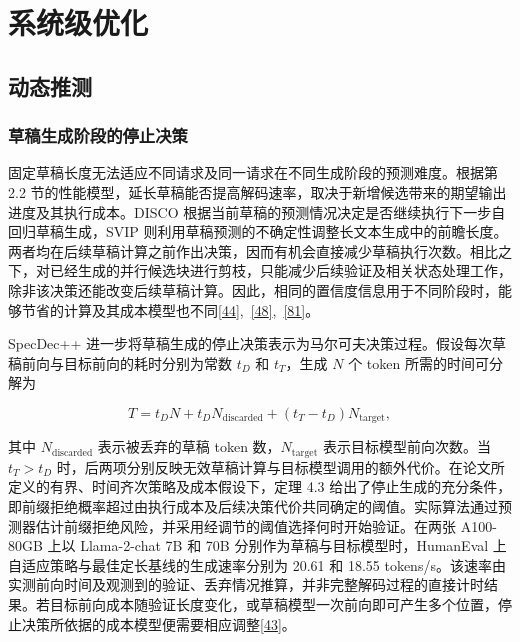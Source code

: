 \documentclass[11pt,a4paper,UTF8,fontset=none,scheme=plain,zihao=-4]{ctexart}
\begin{document}
\hypertarget{section-6}{%
\section{系统级优化}\label{section-6}}

\hypertarget{section-6-1}{%
\subsection{动态推测}\label{section-6-1}}

\hypertarget{section-6-1-1}{%
\subsubsection{草稿生成阶段的停止决策}\label{section-6-1-1}}

固定草稿长度无法适应不同请求及同一请求在不同生成阶段的预测难度。根据第
2.2
节的性能模型，延长草稿能否提高解码速率，取决于新增候选带来的期望输出进度及其执行成本。DISCO
根据当前草稿的预测情况决定是否继续执行下一步自回归草稿生成，SVIP
则利用草稿预测的不确定性调整长文本生成中的前瞻长度。两者均在后续草稿计算之前作出决策，因而有机会直接减少草稿执行次数。相比之下，对已经生成的并行候选块进行剪枝，只能减少后续验证及相关状态处理工作，除非该决策还能改变后续草稿计算。因此，相同的置信度信息用于不同阶段时，能够节省的计算及其成本模型也不同\protect\hyperlink{ref-disco}{{[}44{]}},~\protect\hyperlink{ref-forespark}{{[}48{]}},~\protect\hyperlink{ref-svip}{{[}81{]}}。

SpecDec++
进一步将草稿生成的停止决策表示为马尔可夫决策过程。假设每次草稿前向与目标前向的耗时分别为常数
\(t_D\) 和 \(t_T\)，生成 \(N\) 个 token 所需的时间可分解为

\[
T=t_D N+t_D N_{\mathrm{discarded}}+(t_T-t_D)N_{\mathrm{target}},
\]

其中 \(N_{\mathrm{discarded}}\) 表示被丢弃的草稿 token
数，\(N_{\mathrm{target}}\) 表示目标模型前向次数。当 \(t_T>t_D\)
时，后两项分别反映无效草稿计算与目标模型调用的额外代价。在论文所定义的有界、时间齐次策略及成本假设下，定理
4.3
给出了停止生成的充分条件，即前缀拒绝概率超过由执行成本及后续决策代价共同确定的阈值。实际算法通过预测器估计前缀拒绝风险，并采用经调节的阈值选择何时开始验证。在两张
A100-80GB 上以 Llama-2-chat 7B 和 70B
分别作为草稿与目标模型时，HumanEval
上自适应策略与最佳定长基线的生成速率分别为 20.61 和 18.55
tokens/s。该速率由实测前向时间及观测到的验证、丢弃情况推算，并非完整解码过程的直接计时结果。若目标前向成本随验证长度变化，或草稿模型一次前向即可产生多个位置，停止决策所依据的成本模型便需要相应调整\protect\hyperlink{ref-specdecpp}{{[}43{]}}。
\end{document}
